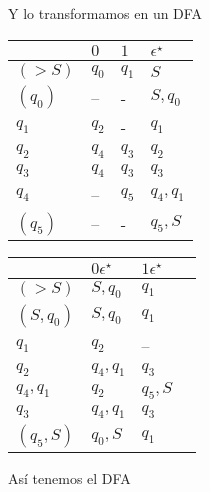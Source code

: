 \documentclass{article}
\begin{document}
\begin{enumerate}
Y lo transformamos en un DFA

\begin{tabular}{ | l || l | l | l  |}
  \hline
    &  $0$    &   $1$  & $\epsilon^\star$ \\
  \hline
$(>S)$  &  $q_0$   &   $q_1$  &  $S$       \\    
$(q_0)$ &  --      &   -      &  $S,q_0$   \\
$q_1$   &  $q_2$   &   -      &  $q_1$     \\
$q_2$   &  $q_4$   &   $q_3$  &  $q_2$     \\
$q_3$   &  $q_4$   &   $q_3$  &  $q_3$     \\
$q_4$   &  --      &   $q_5$  &  $q_4,q_1$ \\
$(q_5)$ &  --      &   -      &  $q_5,S$   \\
  \hline  
\end{tabular}

\begin{tabular}{ | l || l | l | l  |}
  \hline
    &  $0\epsilon^\star$    &   $1\epsilon^\star$  \\
  \hline
$(>S)$   &   $S,q_0$  &  $q_1$   \\    
$(S,q_0)$&   $S,q_0$  &  $q_1$   \\
$q_1$    &   $q_2$    &  --      \\
$q_2$    &   $q_4,q_1$&  $q_3$   \\
$q_4,q_1$&   $q_2$    &  $q_5,S$ \\
$q_3$    &   $q_4,q_1$&  $q_3$   \\
$(q_5,S)$&   $q_0,S$  &  $q_1$   \\
  \hline  
\end{tabular}

Así tenemos el DFA


\end{enumerate}
\end{document}
